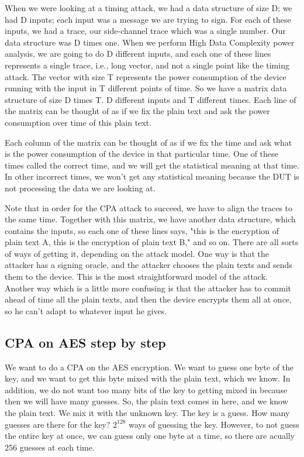 When we were looking at a timing attack, we had a data structure of size D; we
had D inputs; each input was a message we are trying to sign. For each of these
inputs, we had a trace, our side-channel trace which was a single number.
Our data structure was D times one. When we perform High Data Complexity power
analysis, we are going to do D different inputs, and each one of these lines
represents a single trace, i.e., long vector, and not a single point like the
timing attack. The vector with size T represents the power consumption of the device
running with the input in T different points of time. So we have a matrix data
structure of size D times T. D different inputs and T different times. Each line
of the matrix can be thought of as if we fix the plain text and ask the power
consumption over time of this plain text.

Each column of the matrix can be thought of as if we fix the time and ask what is the
power consumption of the device in that particular time. One of these times
called the correct time, and we will get the statistical meaning at that time. In
other incorrect times, we won't get any statistical meaning because the DUT is
not processing the data we are looking at.

Note that in order for the CPA attack to succeed, we have to align the traces to
the same time. Together with this matrix, we have another data structure, which contains
the inputs, so each one of these lines says, "this is the encryption of plain
text A, this is the encryption of plain text B," and so on. There are all sorts of
ways of getting it, depending on the attack model. One way is that the attacker
has a signing oracle, and the attacker chooses the plain texts and sends them to
the device. This is the most straightforward model of the attack. Another way which is a
little more confusing is that the attacker has to commit ahead of time all the
plain texts, and then the device encrypts them all at once, so he can't adapt to
whatever input he gives.

\subsection{CPA on AES step by step}\label{c8_CPA_overview:subsec}

We want to do a CPA on the AES encryption. We want to guess one byte of the key, and we want to get this byte mixed with the plain text, which we know. In addition, we
do not want too many bits of the key to getting mixed in because then we will have many guesses. So, the plain text comes in here, and we know the plain text. We
mix it with the unknown key. The key is a guess. How many guesses are there for
the key?  $2^{128}$ ways of guessing the key. However, to not guess the
entire key at once, we can guess only one byte at a time, so there are acually
256 guesses at each time. 

